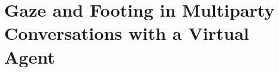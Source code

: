 \pagestyle{deposit}

\chapter{Gaze and Footing in Multiparty Conversations with a Virtual Agent}
\label{cha:GazeFooting}
